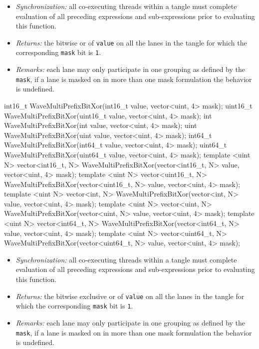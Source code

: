 \begin{itemize}
  \item \textit{Synchronization:} all co-executing threads within a \gls{tangle}
  must complete evaluation of all preceding expressions and sub-expressions
  prior to evaluating this function.
  \item \textit{Returns:} the bitwise or of \texttt{value} on all the
  \gls{lane}s in the \gls{tangle} for which the corresponding \texttt{mask} bit
  is \texttt{1}.
  \item \textit{Remarks:} each \gls{lane} may only participate in one grouping
  as defined by the \texttt{mask}, if a \gls{lane} is masked on in more than one
  mask formulation the behavior is undefined.
\end{itemize}

\begin{HLSL}
int16_t WaveMultiPrefixBitXor(int16_t value, vector<uint, 4> mask);
uint16_t WaveMultiPrefixBitXor(uint16_t value, vector<uint, 4> mask);
int WaveMultiPrefixBitXor(int value, vector<uint, 4> mask);
uint WaveMultiPrefixBitXor(uint value, vector<uint, 4> mask);
int64_t WaveMultiPrefixBitXor(int64_t value, vector<uint, 4> mask);
uint64_t WaveMultiPrefixBitXor(uint64_t value, vector<uint, 4> mask);
template <uint N>
vector<int16_t, N> WaveMultiPrefixBitXor(vector<int16_t, N> value, vector<uint, 4> mask);
template <uint N>
vector<uint16_t, N> WaveMultiPrefixBitXor(vector<uint16_t, N> value, vector<uint, 4> mask);
template <uint N>
vector<int, N> WaveMultiPrefixBitXor(vector<int, N> value, vector<uint, 4> mask);
template <uint N>
vector<uint, N> WaveMultiPrefixBitXor(vector<uint, N> value, vector<uint, 4> mask);
template <uint N>
vector<int64_t, N> WaveMultiPrefixBitXor(vector<int64_t, N> value, vector<uint, 4> mask);
template <uint N>
vector<uint64_t, N> WaveMultiPrefixBitXor(vector<uint64_t, N> value, vector<uint, 4> mask);
\end{HLSL}

\begin{itemize}
  \item \textit{Synchronization:} all co-executing threads within a \gls{tangle}
  must complete evaluation of all preceding expressions and sub-expressions
  prior to evaluating this function.
  \item \textit{Returns:} the bitwise exclusive or of \texttt{value} on all the
  \gls{lane}s in the \gls{tangle} for which the corresponding \texttt{mask} bit
  is \texttt{1}.
  \item \textit{Remarks:} each \gls{lane} may only participate in one grouping
  as defined by the \texttt{mask}, if a \gls{lane} is masked on in more than one
  mask formulation the behavior is undefined.
\end{itemize}

